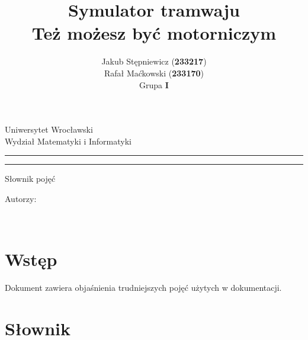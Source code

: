 \documentclass[12pt,a4paper]{article}
\author{Jakub Stępniewicz (\textbf{233217})\\Rafał Maćkowski (\textbf{233170})\\Grupa {\bf I}}
\title{Symulator tramwaju\\ \small{Też możesz być motorniczym}}
\makeatletter
\newcommand{\linia}{\rule{\linewidth}{0.4mm}}
\renewcommand{\maketitle}{\begin{titlepage}
		\vspace*{1cm}
    \begin{center}\small
    	Uniwersytet Wrocławski\\
    	Wydział Matematyki i Informatyki\\
    \end{center}
    \vspace{3cm}
    \noindent
    \linia
    \begin{center}
    	\LARGE{\textsc{\@title}}
         \end{center}
     \linia
    \begin{center}
    	\Large{Słownik pojęć}
         \end{center}
    \vspace{0.5cm}

    \begin{flushright}

    \begin{minipage}{5.5cm}

    	\small Autorzy:

    \normalsize {\@author} \par
    

    \end{minipage}
    \vspace{5cm}

     

     \end{flushright}

    \vspace*{\stretch{6}}

    \begin{center}

    \@date\\

    \end{center}

  \end{titlepage}%

}
\makeatother
\begin{document}
\maketitle
\tableofcontents
\vspace{5cm}
\newpage
% 
\section{Wstęp}
Dokument zawiera objaśnienia trudniejszych pojęć użytych w dokumentacji.

\section{Słownik}
\end{document}
